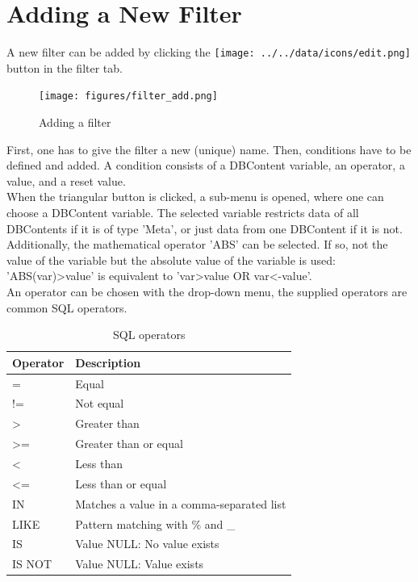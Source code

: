 \section{Adding a New Filter}

A new filter can be added by clicking the \texttt{[image: ../../data/icons/edit.png]} button in the filter tab.

\begin{figure}[H]
  \center
    \texttt{[image: figures/filter\_add.png]}
  \caption{Adding a filter}
\end{figure}

First, one has to give the filter a new (unique) name. Then, conditions have to be defined and added. A condition consists of a DBContent variable, an operator, a value, and a reset value. \\

When the triangular button is clicked, a sub-menu is opened, where one can choose a DBContent variable. The selected variable restricts data of all DBContents if it is of type 'Meta', or just data from one DBContent if it is not. Additionally, the mathematical operator 'ABS' can be selected. If so, not the value of the variable but the absolute value of the variable is used: 'ABS(var)>value' is equivalent to 'var>value OR var<-value'. \\

An operator can be chosen with the drop-down menu, the supplied operators are common SQL operators.

\begin{table}[H]
  \center
  \begin{tabular}{ | l | l |}
    \hline
    \textbf{Operator} & \textbf{Description} \\ \hline
    = & Equal \\ \hline
    != & Not equal \\ \hline
    > & Greater than \\ \hline
    >= & Greater than or equal \\ \hline
    < & Less than \\ \hline
    <= & Less than or equal \\ \hline
    IN & Matches a value in a comma-separated list \\ \hline
    LIKE & Pattern matching with \% and \_ \\ \hline
    IS & Value NULL: No value exists \\ \hline
    IS NOT & Value NULL: Value exists \\
    \hline
  \end{tabular}
  \caption{SQL operators}
\end{table}

